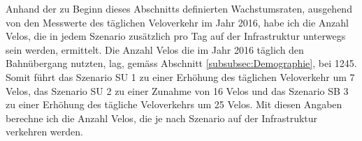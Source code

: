 Anhand der zu Beginn dieses Abschnitts definierten Wachstumsraten, ausgehend von den Messwerte des täglichen Veloverkehr im Jahr 2016, habe ich die Anzahl Velos, die in jedem Szenario zusätzlich pro Tag auf der Infrastruktur unterwegs sein werden, ermittelt. Die Anzahl Velos die im Jahr 2016 täglich den Bahnübergang nutzten, lag, gemäss Abschnitt \ref{subsubsec:Demographie}, bei 1245.
Somit führt das Szenario SU 1 zu einer Erhöhung des täglichen Veloverkehr um 7 Velos, das Szenario SU 2 zu einer Zunahme von 16 Velos und das Szenario SB 3 zu einer Erhöhung des tägliche Veloverkehrs um 25 Velos. 
Mit diesen Angaben berechne ich die Anzahl Velos, die je nach Szenario auf der Infrastruktur verkehren werden.

%

